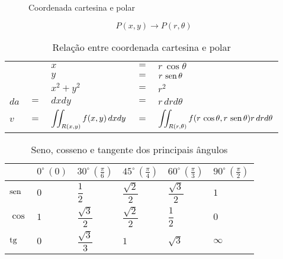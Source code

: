 \begin{figure}[H]
	\centering
	\quad\quad
	
	\caption{Coordenada cartesina e polar}
	\label{coordenada_cartesiana_polar}
\end{figure}

$$P(x,y) \rightarrow P(r,\theta)$$

\begin{table}[H]
	\centering
	\begin{tabular}{|lclcl|}
		\hline
		     &     & $x$                                 & $=$ & $r\,\cos \theta$                                                         \\
		     &     & $y$                                 & $=$ & $r\,\operatorname{sen} \theta$                                                         \\
		     &     & $x^2 + y^2$                         & $=$ & $r^2$                                                                    \\
		$da$ & $=$ & $dxdy$                              & $=$ & $r\,drd\theta$                                                           \\
		$v$  & $=$ & $\displaystyle\iint_{R(x,y)} f(x,y)\, dxdy$ & $=$ & $\displaystyle\iint_{R(r,\theta)} f(r\,\cos \theta,r\,\operatorname{sen} \theta) r\,drd\theta$ \\ \hline
	\end{tabular}
	\caption{Relação entre coordenada cartesina e polar}
	\label{relacao_coordenada_cartesiana_polar}
\end{table}

\begin{table}[H]
	\centering
	\begin{tabular}{|l|l|l|l|l|l|}
		\hline
		       & $0^\circ\, (0)$ & $30^\circ\, \left(\frac{\pi}{6}\right)$ & $45^\circ\, \left(\frac{\pi}{4}\right)$ & $60^\circ\, \left(\frac{\pi}{3}\right)$ & $90^\circ\, \left(\frac{\pi}{2}\right)$ \\ \hline
		$\operatorname{sen}$ & $0$             & $\dfrac{1}{2}$                          & $\dfrac{\sqrt{2}}{2}$                   & $\dfrac{\sqrt{3}}{2}$                   & $1$                                     \\ \hline
		$\cos$ & $1$             & $\dfrac{\sqrt{3}}{2}$                   & $\dfrac{\sqrt{2}}{2}$                   & $\dfrac{1}{2}$                          & $0$                                     \\ \hline
		$\operatorname{tg}$  & $0$             & $\dfrac{\sqrt{3}}{3}$                   & $1$                                     & $\sqrt{3}$                              & $\infty$                                \\ \hline
	\end{tabular}
	\caption{Seno, cosseno e tangente dos principais ângulos}
	\label{sen_cos_tg_angulos_principais}
\end{table}

